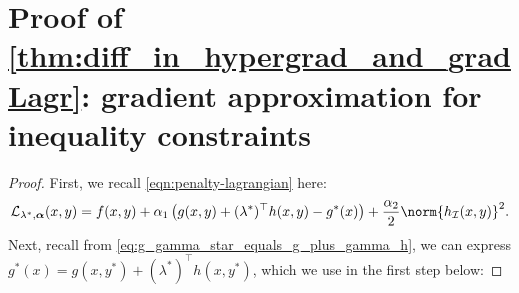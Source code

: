 \section{Proof of \cref{thm:diff_in_hypergrad_and_gradLagr}: gradient approximation for inequality constraints}\label{appendix:proof-of-inexact-gradient}
\gradientApproximation*
\begin{proof}
First, we recall \cref{eqn:penalty-lagrangian} here: \[\mathcal{L}_{\lambda^*,\boldsymbol{\alpha}}(x,y) = f(x,y) + \alpha_1 \left( g(x,y) + (\lambda^*)^\top h(x,y) - g^*(x)  \right) + \frac{\alpha_2}{2} \norm{h_\mathcal{I}(x,y)}^2.\] Next, recall from \cref{eq:g_gamma_star_equals_g_plus_gamma_h}, we can express $g^*(x)=g(x,y^*)+(\lambda^*)^\top h(x,y^*)$, which we use in the first step below: 


\end{proof}

